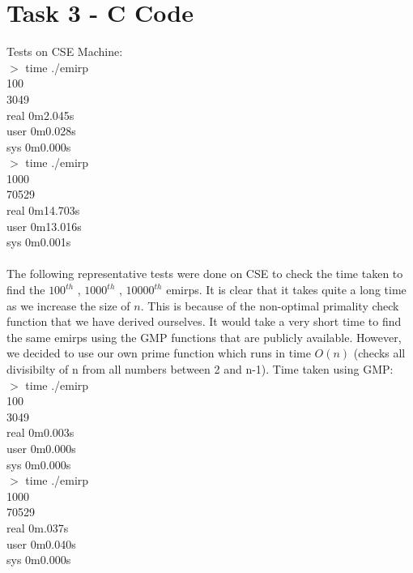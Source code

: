\documentclass[a4paper,12pt,fleqn]{scrartcl}
\begin{document}
\section{Task 3 - C Code}
\label{sec:task-3}

Tests on CSE Machine:\\
$>$	time ./emirp\\
	100\\
	3049\\
	real 0m2.045s\\
	user 0m0.028s\\
	sys 0m0.000s\\
$>$	time ./emirp\\
	1000\\
	70529\\
	real 0m14.703s\\
	user 0m13.016s\\
	sys 0m0.001s\\\\	
The following representative tests were done on CSE to check the time taken to find the $100^{th}$ , $1000^{th}$ , $10000^{th}$ emirps. It is clear that it takes quite a long time as we increase the size of $n$. This is because of the non-optimal primality check function that we have derived ourselves. It would take a very short time to find the same emirps using the GMP functions that are publicly available. However, we decided to use our own prime function which runs in time $O(n)$ (checks all divisibilty of n from all numbers between 2 and n-1).
Time taken using GMP:\\
$>$	time ./emirp\\
	100\\
	3049\\
	real 0m0.003s\\
	user 0m0.000s\\
	sys 0m0.000s\\
$>$	time ./emirp\\
	1000\\
	70529\\
	real 0m.037s\\
	user 0m0.040s\\
	sys 0m0.000s\\
\end{document}
